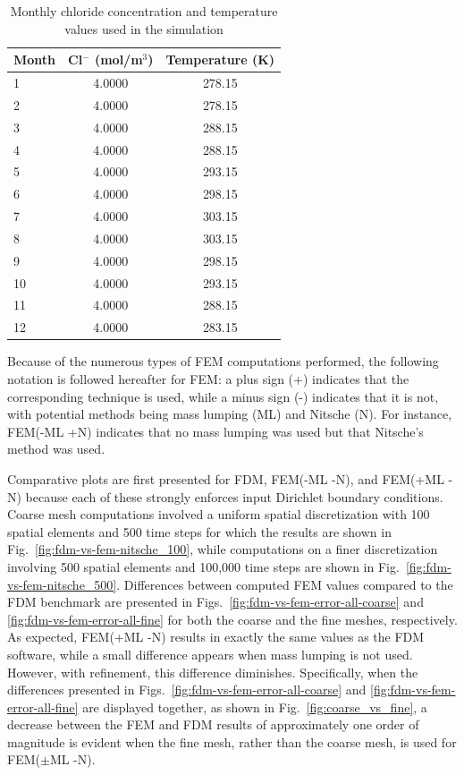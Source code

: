 \documentclass[conference]{IEEEtran}
\begin{document}
\begin{table}[!tb]
\caption{Monthly chloride concentration and temperature values used in the simulation}
\label{tab:monthly-data}
\centering
\begin{tabular}{|l|c|c|}
\hline
\textbf{Month} & \textbf{Cl$^{-}$ (mol/m$^{3}$)} & \textbf{Temperature (K)} \\
\hline
1  & 4.0000 & 278.15 \\
\hline
2  & 4.0000 & 278.15 \\
\hline
3  & 4.0000 & 288.15 \\
\hline
4  & 4.0000 & 288.15 \\
\hline
5  & 4.0000 & 293.15 \\
\hline
6  & 4.0000 & 298.15 \\
\hline
7  & 4.0000 & 303.15 \\
\hline
8  & 4.0000 & 303.15 \\
\hline
9  & 4.0000 & 298.15 \\
\hline
10  & 4.0000 & 293.15 \\
\hline
11 & 4.0000 & 288.15 \\
\hline
12 & 4.0000 & 283.15 \\
\hline
\end{tabular}
\end{table}


Because of the numerous types of FEM computations performed, the following notation is followed hereafter for FEM: a plus sign (+) indicates that the corresponding technique is used, while a minus sign (-) indicates that it is not, with potential methods being mass lumping (ML) and Nitsche (N).
For instance, FEM(-ML +N) indicates that no  mass lumping was used but that Nitsche’s method was used. 


Comparative plots are first presented for FDM, FEM(-ML -N), and FEM(+ML -N) because each of these strongly enforces input Dirichlet boundary conditions.
Coarse mesh computations involved a uniform spatial discretization with 100 spatial  elements and 500 time steps for which the results are shown in Fig.~\ref{fig:fdm-vs-fem-nitsche_100},
while computations on a finer discretization involving 500 spatial elements and 100,000 time steps are shown in Fig.~\ref{fig:fdm-vs-fem-nitsche_500}.
Differences between computed FEM values compared to the FDM benchmark are presented in Figs.~\ref{fig:fdm-vs-fem-error-all-coarse} and \ref{fig:fdm-vs-fem-error-all-fine} for both the coarse and the fine meshes, respectively.
As expected, FEM(+ML -N) results in exactly the same values as the FDM software, while a small difference appears when mass lumping is not used.
However, with refinement, this difference diminishes. 
Specifically, when the differences presented in Figs.~\ref{fig:fdm-vs-fem-error-all-coarse} and \ref{fig:fdm-vs-fem-error-all-fine} are displayed together, as shown in Fig.~\ref{fig:coarse_vs_fine}, a decrease between the FEM and FDM results of approximately one order of magnitude is evident when the fine mesh, rather than the coarse mesh, is used for FEM($\pm$ML -N).
\end{document}
